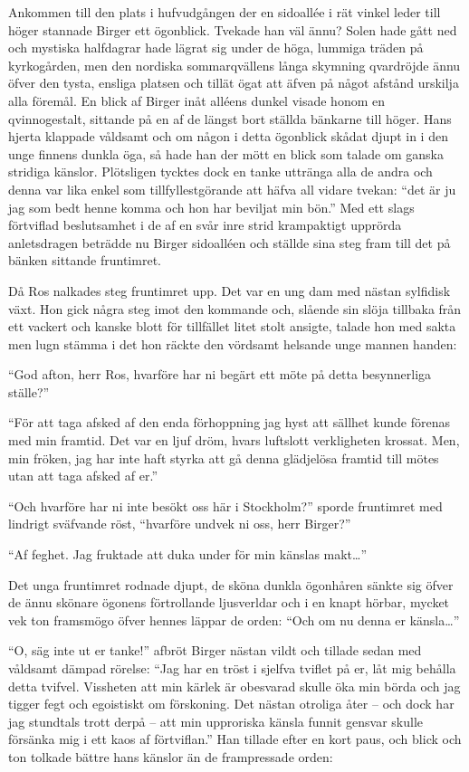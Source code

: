 Ankommen till den plats i hufvudgången der en sidoallée i rät vinkel
leder till höger stannade Birger ett ögonblick. Tvekade han väl ännu?
Solen hade gått ned och mystiska halfdagrar hade lägrat sig under de
höga, lummiga träden på kyrkogården, men den nordiska sommarqvällens
långa skymning qvardröjde ännu öfver den tysta, ensliga platsen och
tillät ögat att äfven på något afstånd urskilja alla föremål. En blick
af Birger inåt alléens dunkel visade honom en qvinnogestalt, sittande på
en af de längst bort ställda bänkarne till höger. Hans hjerta klappade
våldsamt och om någon i detta ögonblick skådat djupt in i den unge
finnens dunkla öga, så hade han der mött en blick som talade om ganska
stridiga känslor. Plötsligen tycktes dock en tanke uttränga alla de
andra och denna var lika enkel som tillfyllestgörande att häfva all
vidare tvekan: ``det är ju jag som bedt henne komma och hon har beviljat
min bön.'' Med ett slags förtviflad beslutsamhet i de af en svår inre
strid krampaktigt upprörda anletsdragen beträdde nu Birger sidoalléen
och ställde sina steg fram till det på bänken sittande fruntimret.

Då Ros nalkades steg fruntimret upp. Det var en ung dam med nästan
sylfidisk växt. Hon gick några steg imot den kommande och, slående sin
slöja tillbaka från ett vackert och kanske blott för tillfället litet
stolt ansigte, talade hon med sakta men lugn stämma i det hon räckte den
vördsamt helsande unge mannen handen:

``God afton, herr Ros, hvarföre har ni begärt ett möte på detta
besynnerliga ställe?''

``För att taga afsked af den enda förhoppning jag hyst att sällhet kunde
förenas med min framtid. Det var en ljuf dröm, hvars luftslott
verkligheten krossat. Men, min fröken, jag har inte haft styrka att gå
denna glädjelösa framtid till mötes utan att taga afsked af er.''

``Och hvarföre har ni inte besökt oss här i Stockholm?'' sporde
fruntimret med lindrigt sväfvande röst, ``hvarföre undvek ni oss, herr
Birger?''

``Af feghet. Jag fruktade att duka under för min känslas makt\ldots{}''

Det unga fruntimret rodnade djupt, de sköna dunkla ögonhåren sänkte sig
öfver de ännu skönare ögonens förtrollande ljusverldar och i en knapt
hörbar, mycket vek ton framsmögo öfver hennes läppar de orden: ``Och om
nu denna er känsla\ldots{}''

``O, säg inte ut er tanke!'' afbröt Birger nästan vildt och tillade
sedan med våldsamt dämpad rörelse: ``Jag har en tröst i sjelfva tviflet
på er, låt mig behålla detta tvifvel. Vissheten att min kärlek är
obesvarad skulle öka min börda och jag tigger fegt och egoistiskt om
förskoning. Det nästan otroliga åter -- och dock har jag stundtals trott
derpå -- att min upproriska känsla funnit gensvar skulle försänka mig i
ett kaos af förtviflan.'' Han tillade efter en kort paus, och blick och
ton tolkade bättre hans känslor än de frampressade orden:

